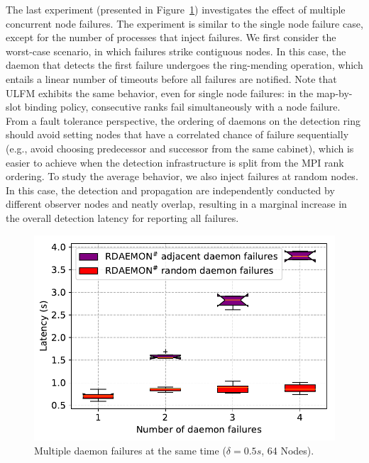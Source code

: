 \documentclass[5p,times,twocolumn]{elsarticle}
\newcommand{\ulfm}[0]{\textsc{ULFM}\xspace}
\newcommand{\mpi}[0]{\textsc{MPI}\xspace}
\begin{document}
The last experiment (presented in Figure~\ref{fig:multi.daemon.failure.nacl}) investigates the effect of multiple concurrent node failures. The experiment is similar to the single node failure case, except for the
number of processes that inject failures.
We first consider the worst-case scenario, in which failures strike
contiguous nodes. In this case, the daemon that detects the first failure
undergoes the ring-mending operation, which entails a linear number of timeouts
before all failures are notified. Note that \ulfm exhibits the same behavior, even
for single node failures: in the map-by-slot binding policy, consecutive ranks
fail simultaneously with a node failure. From a fault
tolerance perspective, the ordering of
daemons on the detection ring should avoid setting nodes that have a
correlated chance of failure sequentially (e.g., avoid choosing predecessor and successor from the same cabinet),
which is easier to achieve when the detection infrastructure is split from
the \mpi rank ordering.
To study the average behavior, we also inject failures at random nodes.
In this case, the detection and propagation are independently conducted by different observer nodes and neatly overlap, resulting in a marginal increase in the overall detection latency for
reporting all failures.

\begin{figure}[h]
  \centering
  \includegraphics[width=\linewidth]{multi_daemon_failures.pdf}
  \caption{Multiple daemon failures at the same time ($ \delta = 0.5s $, 64 Nodes).}
  \label{fig:multi.daemon.failure.nacl}
\end{figure}
\end{document}
